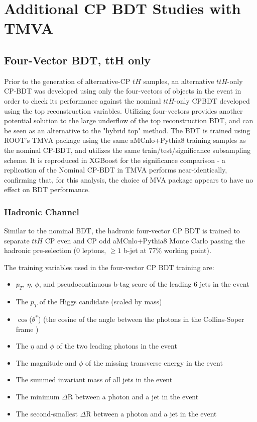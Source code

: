 \section{Additional CP BDT Studies with TMVA}
\label{sec:TMVABDTStudies}

\subsection{Four-Vector BDT, ttH only}
Prior to the generation of alternative-CP $tH$ samples, an alternative $ttH$-only CP-BDT was developed using only the four-vectors of objects in the event in order to check its performance against the nominal $ttH$-only CPBDT developed using the top reconstruction variables. Utilizing four-vectors provides another potential solution to the large underflow of the top reconstruction BDT, and can be seen as an alternative to the "hybrid top" method. The BDT is trained using ROOT's TMVA package \cite{TMVA} using the same aMCnlo+Pythia8 training samples as the nominal CP-BDT, and utilizes the same train/test/significance subsampling scheme. It is reproduced in XGBoost for the significance comparison - a replication of the Nominal CP-BDT in TMVA performs near-identically, confirming that, for this analysis, the choice of MVA package appears to have no effect on BDT performance.

\subsubsection{Hadronic Channel}

Similar to the nominal BDT, the hadronic four-vector CP BDT is trained to separate $ttH$ CP even and CP odd aMCnlo+Pythia8 Monte Carlo passing the hadronic pre-selection (0 leptons, $\ge1$ b-jet at 77\% working point).

The training variables used in the four-vector CP BDT training are:
\begin{itemize}
\item $p_{T}$, $\eta$, $\phi$, and pseudocontinuous b-tag score of the leading 6 jets in the event
\item The $p_{T}$ of the Higgs candidate (scaled by mass)
\item  $\cos$($\theta^{*}$) (the cosine of the angle between the photons in the Collins-Soper frame \cite{thetastar})
\item The $\eta$ and $\phi$ of the two leading photons in the event
\item The magnitude and $\phi$ of the missing transverse energy in the event
\item The summed invariant mass of all jets in the event
\item The minimum $\Delta$R between a photon and a jet in the event
\item The second-smallest $\Delta$R between a photon and a jet in the event
\end{itemize} 

